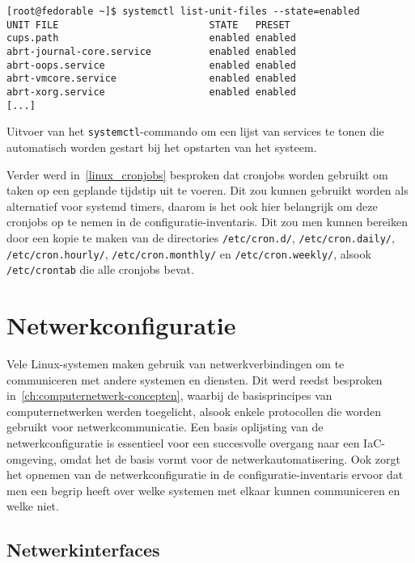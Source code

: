 \begin{listing}
  \begin{verbatim}
[root@fedorable ~]$ systemctl list-unit-files --state=enabled
UNIT FILE                          STATE   PRESET
cups.path                          enabled enabled
abrt-journal-core.service          enabled enabled
abrt-oops.service                  enabled enabled
abrt-vmcore.service                enabled enabled
abrt-xorg.service                  enabled enabled
[...]
  \end{verbatim}
  \caption{Uitvoer van het \texttt{systemctl}-commando om een lijst van services te tonen die automatisch worden gestart bij het opstarten van het systeem.}
  \label{lst:systemd_list_unit_files}
\end{listing}

Verder werd in~\ref{linux_cronjobs} besproken dat cronjobs worden gebruikt om taken op een geplande tijdstip uit te voeren.
Dit zou kunnen gebruikt worden als alternatief voor systemd timers, daarom is het ook hier belangrijk om deze cronjobs op te nemen in de configuratie-inventaris.
Dit zou men kunnen bereiken door een kopie te maken van de directories \texttt{/etc/cron.d/}, \texttt{/etc/cron.daily/}, \texttt{/etc/cron.hourly/}, \texttt{/etc/cron.monthly/} en \texttt{/etc/cron.weekly/}, alsook \texttt{/etc/crontab} die alle cronjobs bevat.

\section{Netwerkconfiguratie}
\label{risico_netwerkconfiguratie}

Vele Linux-systemen maken gebruik van netwerkverbindingen om te communiceren met andere systemen en diensten.
Dit werd reedst besproken in~\ref{ch:computernetwerk-concepten}, waarbij de basisprincipes van computernetwerken werden toegelicht, alsook enkele protocollen die worden gebruikt voor netwerkcommunicatie.
Een basis oplijsting van de netwerkconfiguratie is essentieel voor een succesvolle overgang naar een IaC-omgeving, omdat het de basis vormt voor de netwerkautomatisering.
Ook zorgt het opnemen van de netwerkconfiguratie in de configuratie-inventaris ervoor dat men een begrip heeft over welke systemen met elkaar kunnen communiceren en welke niet.

\subsection{Netwerkinterfaces}
\label{risico_netwerkinterfaces}

